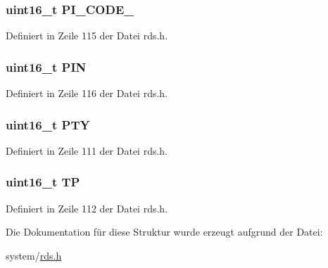 \subsubsection[{P\+I\+\_\+\+C\+O\+D\+E\+\_\+2}]{\setlength{\rightskip}{0pt plus 5cm}uint16\+\_\+t P\+I\+\_\+\+C\+O\+D\+E\+\_}\label{structgroup__1b_ae86fed9d07832a5c3cc36d5aaa064bcb}


Definiert in Zeile 115 der Datei rds.\+h.

\hypertarget{structgroup__1b_a23b9db30b873d9b45f435df66328a784}{}
\subsubsection[{P\+I\+N}]{\setlength{\rightskip}{0pt plus 5cm}uint16\+\_\+t P\+I\+N}\label{structgroup__1b_a23b9db30b873d9b45f435df66328a784}


Definiert in Zeile 116 der Datei rds.\+h.

\hypertarget{structgroup__1b_a0474967478fbbc2c71b800d2e0132d45}{}
\subsubsection[{P\+T\+Y}]{\setlength{\rightskip}{0pt plus 5cm}uint16\+\_\+t P\+T\+Y}\label{structgroup__1b_a0474967478fbbc2c71b800d2e0132d45}


Definiert in Zeile 111 der Datei rds.\+h.

\hypertarget{structgroup__1b_ab9e634c63b0d95a96716d5f6d7f06d72}{}
\subsubsection[{T\+P}]{\setlength{\rightskip}{0pt plus 5cm}uint16\+\_\+t T\+P}\label{structgroup__1b_ab9e634c63b0d95a96716d5f6d7f06d72}


Definiert in Zeile 112 der Datei rds.\+h.



Die Dokumentation für diese Struktur wurde erzeugt aufgrund der Datei\+:\begin{DoxyCompactItemize}
\item 
system/\hyperlink{rds_8h}{rds.\+h}\end{DoxyCompactItemize}
